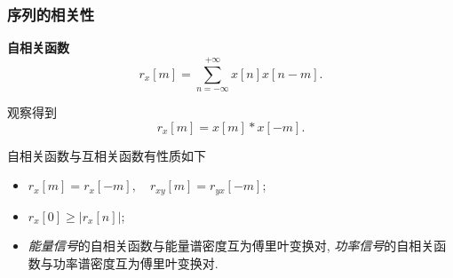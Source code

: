 \subsubsection{序列的相关性}
\textbf{自相关函数}
\begin{equation}
    r_x[m]=\sum_{n=-\infty}^{+\infty}x[n]x[n-m].
\end{equation}

观察得到
\begin{equation}
    r_x[m]=x[m]*x[-m].
\end{equation}

自相关函数与互相关函数有性质如下
\begin{itemize}
    \item $r_x[m]=r_x[-m], \quad r_{xy}[m]=r_{yx}[-m]$;
    \item $r_x[0]\geq |r_x[n]|$;
    \item \textit{能量信号}的自相关函数与能量谱密度互为傅里叶变换对, \textit{功率信号}的自相关函数与功率谱密度互为傅里叶变换对.
\end{itemize}

